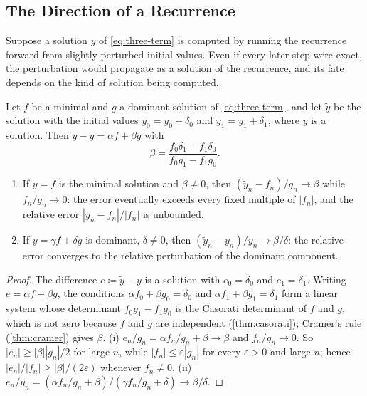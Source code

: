 \subsection{The Direction of a Recurrence}

Suppose a solution $y$ of \eqref{eq:three-term} is computed by running the recurrence forward from slightly perturbed initial values. Even if every later step were exact, the perturbation would propagate as a solution of the recurrence, and its fate depends on the kind of solution being computed.

\begin{theorem}
\label{thm:recurrence-direction}
Let $f$ be a minimal and $g$ a dominant solution of \eqref{eq:three-term}, and let $\tilde y$ be the solution with the initial values $\tilde y_0=y_0+\delta_0$ and $\tilde y_1=y_1+\delta_1$, where $y$ is a solution. Then $\tilde y-y=\alpha f+\beta g$ with
\[
\beta=\frac{f_0\delta_1-f_1\delta_0}{f_0g_1-f_1g_0} .
\]
\begin{enumerate}
\item If $y=f$ is the minimal solution and $\beta\ne0$, then $(\tilde y_n-f_n)/g_n\to\beta$ while $f_n/g_n\to0$: the error eventually exceeds every fixed multiple of $|f_n|$, and the relative error $|\tilde y_n-f_n|/|f_n|$ is unbounded.
\item If $y=\gamma f+\delta g$ is dominant, $\delta\ne0$, then $(\tilde y_n-y_n)/y_n\to\beta/\delta$: the relative error converges to the relative perturbation of the dominant component.
\end{enumerate}
\end{theorem}

\begin{proof}
The difference $e\coloneqq\tilde y-y$ is a solution with $e_0=\delta_0$ and $e_1=\delta_1$. Writing $e=\alpha f+\beta g$, the conditions $\alpha f_0+\beta g_0=\delta_0$ and $\alpha f_1+\beta g_1=\delta_1$ form a linear system whose determinant $f_0g_1-f_1g_0$ is the Casorati determinant of $f$ and $g$, which is not zero because $f$ and $g$ are independent (\cref{thm:casorati}); Cramer's rule (\cref{thm:cramer}) gives $\beta$. (i) $e_n/g_n=\alpha f_n/g_n+\beta\to\beta$ and $f_n/g_n\to0$. So $|e_n|\ge|\beta||g_n|/2$ for large $n$, while $|f_n|\le\varepsilon|g_n|$ for every $\varepsilon>0$ and large $n$; hence $|e_n|/|f_n|\ge|\beta|/(2\varepsilon)$ whenever $f_n\ne0$. (ii) $e_n/y_n=(\alpha f_n/g_n+\beta)/(\gamma f_n/g_n+\delta)\to\beta/\delta$.
\end{proof}


